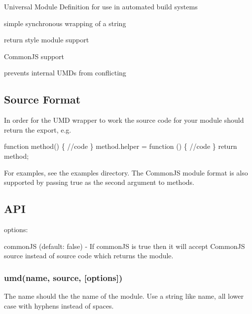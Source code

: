 

Universal Module Definition for use in automated build systems


\begin{DoxyItemize}
\item simple synchronous wrapping of a string
\item {\ttfamily return} style module support
\item Common\+JS support
\item prevents internal U\+M\+Ds from conflicting
\end{DoxyItemize}

\href{https://travis-ci.org/ForbesLindesay/umd}{\tt } \href{https://david-dm.org/ForbesLindesay/umd}{\tt } \href{https://www.npmjs.com/package/umd}{\tt }

\subsection*{Source Format}

In order for the U\+MD wrapper to work the source code for your module should {\ttfamily return} the export, e.\+g.


\begin{DoxyCode}
function method() \{
  //code
\}
method.helper = function () \{
  //code
\}
return method;
\end{DoxyCode}


For examples, see the examples directory. The Common\+JS module format is also supported by passing true as the second argument to methods.

\subsection*{A\+PI}

options\+:


\begin{DoxyItemize}
\item {\ttfamily common\+JS} (default\+: {\ttfamily false}) -\/ If common\+JS is {\ttfamily true} then it will accept Common\+JS source instead of source code which {\ttfamily return}s the module.
\end{DoxyItemize}

\subsubsection*{umd(name, source, \mbox{[}options\mbox{]})}

The {\ttfamily name} should the the name of the module. Use a string like name, all lower case with hyphens instead of spaces.

